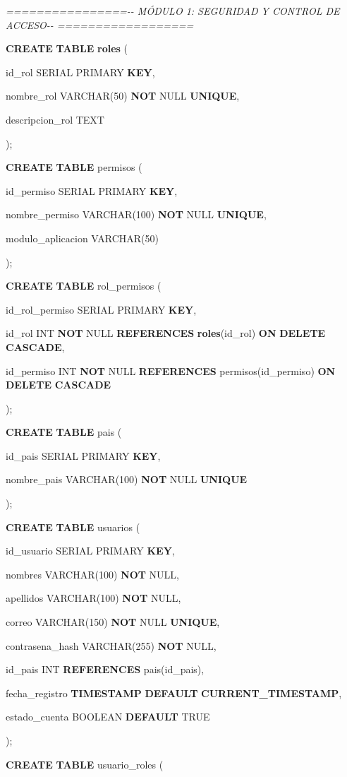 \documentclass[
]{article}
\begin{document}
\emph{================-\/- MÓDULO 1: SEGURIDAD Y CONTROL DE ACCESO-\/-
==================}

\textbf{CREATE} \textbf{TABLE} \textbf{roles} (

id\_rol SERIAL PRIMARY \textbf{KEY},

nombre\_rol VARCHAR(50) \textbf{NOT} NULL \textbf{UNIQUE},

descripcion\_rol TEXT

);

\textbf{CREATE} \textbf{TABLE} permisos (

id\_permiso SERIAL PRIMARY \textbf{KEY},

nombre\_permiso VARCHAR(100) \textbf{NOT} NULL \textbf{UNIQUE},

modulo\_aplicacion VARCHAR(50)

);

\textbf{CREATE} \textbf{TABLE} rol\_permisos (

id\_rol\_permiso SERIAL PRIMARY \textbf{KEY},

id\_rol INT \textbf{NOT} NULL \textbf{REFERENCES}
\textbf{roles}(id\_rol) \textbf{ON} \textbf{DELETE} \textbf{CASCADE},

id\_permiso INT \textbf{NOT} NULL \textbf{REFERENCES}
permisos(id\_permiso) \textbf{ON} \textbf{DELETE} \textbf{CASCADE}

);

\textbf{CREATE} \textbf{TABLE} pais (

id\_pais SERIAL PRIMARY \textbf{KEY},

nombre\_pais VARCHAR(100) \textbf{NOT} NULL \textbf{UNIQUE}

);

\textbf{CREATE} \textbf{TABLE} usuarios (

id\_usuario SERIAL PRIMARY \textbf{KEY},

nombres VARCHAR(100) \textbf{NOT} NULL,

apellidos VARCHAR(100) \textbf{NOT} NULL,

correo VARCHAR(150) \textbf{NOT} NULL \textbf{UNIQUE},

contrasena\_hash VARCHAR(255) \textbf{NOT} NULL,

id\_pais INT \textbf{REFERENCES} pais(id\_pais),

fecha\_registro \textbf{TIMESTAMP} \textbf{DEFAULT}
\textbf{CURRENT\_TIMESTAMP},

estado\_cuenta BOOLEAN \textbf{DEFAULT} TRUE

);

\textbf{CREATE} \textbf{TABLE} usuario\_roles (
\end{document}
